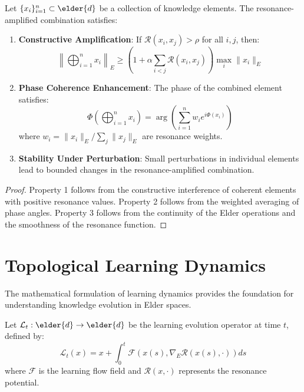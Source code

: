 \begin{theorem}
Let $\{x_i\}_{i=1}^n \subset \elder{d}$ be a collection of knowledge elements. The resonance-amplified combination satisfies:
\begin{enumerate}
    \item \textbf{Constructive Amplification}: If $\mathcal{R}(x_i, x_j) > \rho$ for all $i, j$, then:
    \begin{equation}
    \left\|\bigoplus_{i=1}^n x_i\right\|_E \geq \left(1 + \alpha \sum_{i<j} \mathcal{R}(x_i, x_j)\right) \max_i \|x_i\|_E
    \end{equation}
    
    \item \textbf{Phase Coherence Enhancement}: The phase of the combined element satisfies:
    \begin{equation}
    \Phi\left(\bigoplus_{i=1}^n x_i\right) = \arg\left(\sum_{i=1}^n w_i e^{i\Phi(x_i)}\right)
    \end{equation}
    where $w_i = \|x_i\|_E / \sum_j \|x_j\|_E$ are resonance weights.
    
    \item \textbf{Stability Under Perturbation}: Small perturbations in individual elements lead to bounded changes in the resonance-amplified combination.
\end{enumerate}
\end{theorem}

\begin{proof}
Property 1 follows from the constructive interference of coherent elements with positive resonance values. Property 2 follows from the weighted averaging of phase angles. Property 3 follows from the continuity of the Elder operations and the smoothness of the resonance function.
\end{proof}

\section{Topological Learning Dynamics}

The mathematical formulation of learning dynamics provides the foundation for understanding knowledge evolution in Elder spaces.

\begin{definition}
Let $\mathcal{L}_t: \elder{d} \rightarrow \elder{d}$ be the learning evolution operator at time $t$, defined by:
\begin{equation}
\mathcal{L}_t(x) = x + \int_0^t \mathcal{F}(x(s), \nabla_E \mathcal{R}(x(s), \cdot)) ds
\end{equation}
where $\mathcal{F}$ is the learning flow field and $\mathcal{R}(x, \cdot)$ represents the resonance potential.
\end{definition}

